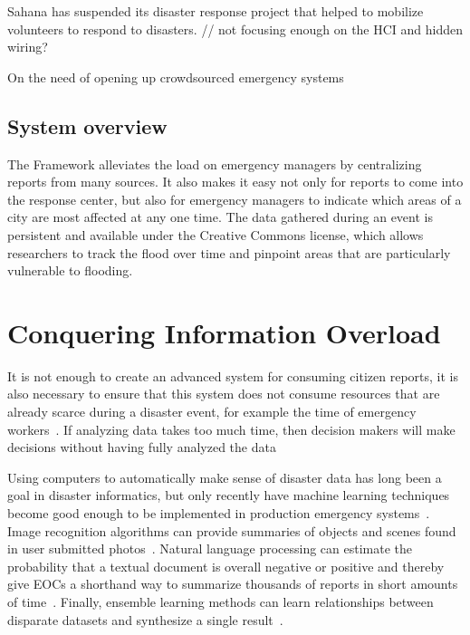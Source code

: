 	Sahana has suspended its disaster response project that helped to
	mobilize volunteers to respond to disasters.
	// not focusing enough on the HCI and hidden wiring?
	
	On the need of opening up crowdsourced emergency systems~\cite{avvenutiNeedOpeningCrowdsourced2018a}

    \subsection{System overview}
    The  Framework alleviates the load on emergency managers by centralizing reports from many sources. It also makes it easy not only for reports to come into the response center, but also for emergency managers to indicate which areas of a city are most affected at any one time. The data gathered during an event is persistent and available under the Creative Commons license, which allows researchers to track the flood over time and pinpoint areas that are particularly vulnerable to flooding. 

\section{Conquering Information Overload}
	It is not enough to create an advanced system for consuming citizen
	reports, it is also necessary to ensure that this system does not
	consume resources that are already scarce during a disaster event, for
	example the time of emergency
	workers~\cite{aminDataNaturalDisasters2008}. If analyzing data takes too
	much time, then decision makers will make decisions without having fully
	analyzed the data~\cite{quarantelliUrbanVulnerabilityDisasters2003}

	Using computers to automatically make sense of disaster data has long
	been a goal in disaster informatics, but only recently have machine
	learning techniques become good enough to be implemented in production
	emergency systems~\cite{meierDigitalHumanitariansHow2015}. Image
	recognition algorithms can provide summaries of objects and scenes found
	in user submitted photos~\cite{nguyenRapidClassificationCrisisRelated,
	donahueDeCAFDeepConvolutional2013}. Natural language processing can
	estimate the probability that a textual document is overall negative or positive
	and thereby give EOCs a shorthand way to summarize thousands of reports
	in short amounts of time~\cite{nguyenRapidClassificationCrisisRelated,
	nagyCrowdSentimentDetection2012}. Finally, ensemble learning methods can
	learn relationships between disparate datasets and synthesize a single
	result~\cite{mouzannarDamageIdentificationSocial2018}.

